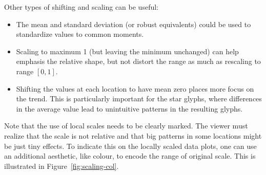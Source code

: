 \documentclass[oneside]{article}
\begin{document}
Other types of shifting and scaling can be useful:

\begin{itemize}

  \item The mean and standard deviation (or robust equivalents) could be used
  to standardize values to common moments.
  
   \item Scaling to maximum 1 (but leaving the minimum unchanged) can help
  emphasis the relative shape, but not distort the range as much as rescaling
  to range $[0, 1]$.

  \item Shifting the values at each location to have mean zero places more
  focus on the trend. This is particularly important for the star glyphs,
  where differences in the average value lead to unintuitive patterns in the
  resulting glyphs.

\end{itemize}

Note that the use of local scales needs to be clearly marked. The viewer must realize that the scale is not relative and that big patterns in some locations might be just tiny effects. To indicate this on the locally scaled data plots, one can use an additional aesthetic, like colour, to encode the range of original scale. This is illustrated in Figure~\ref{fig:scaling-col}.
\end{document}
